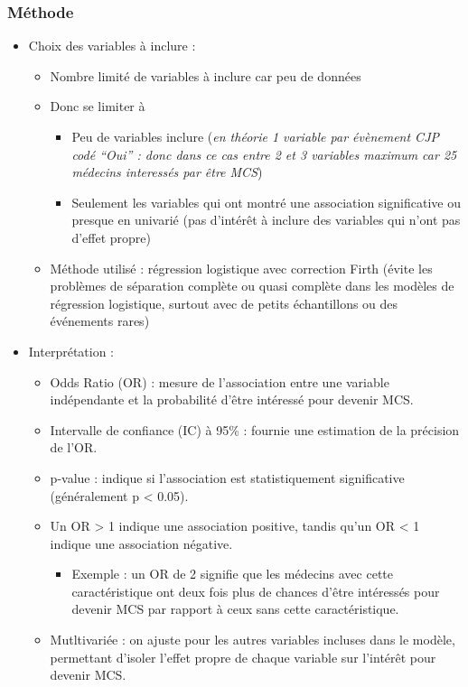 \documentclass[
]{article}
\providecommand{\tightlist}{%
  \setlength{\itemsep}{0pt}\setlength{\parskip}{0pt}}
\begin{document}
\subsubsection{Méthode}\label{muxe9thode}

\begin{itemize}
\item
  Choix des variables à inclure :

  \begin{itemize}
  \item
    Nombre limité de variables à inclure car peu de données
  \item
    Donc se limiter à

    \begin{itemize}
    \item
      Peu de variables inclure (\emph{en théorie 1 variable par
      évènement CJP codé ``Oui'' : donc dans ce cas entre 2 et 3
      variables maximum car 25 médecins interessés par être MCS})
    \item
      Seulement les variables qui ont montré une association
      significative ou presque en univarié (pas d'intérêt à inclure des
      variables qui n'ont pas d'effet propre)
    \end{itemize}
  \item
    Méthode utilisé : régression logistique avec correction Firth (évite
    les problèmes de séparation complète ou quasi complète dans les
    modèles de régression logistique, surtout avec de petits
    échantillons ou des événements rares)
  \end{itemize}
\item
  Interprétation :

  \begin{itemize}
  \item
    Odds Ratio (OR) : mesure de l'association entre une variable
    indépendante et la probabilité d'être intéressé pour devenir MCS.
  \item
    Intervalle de confiance (IC) à 95\% : fournie une estimation de la
    précision de l'OR.
  \item
    p-value : indique si l'association est statistiquement significative
    (généralement p \textless{} 0.05).
  \item
    Un OR \textgreater{} 1 indique une association positive, tandis
    qu'un OR \textless{} 1 indique une association négative.

    \begin{itemize}
    \tightlist
    \item
      Exemple : un OR de 2 signifie que les médecins avec cette
      caractéristique ont deux fois plus de chances d'être intéressés
      pour devenir MCS par rapport à ceux sans cette caractéristique.
    \end{itemize}
  \item
    Mutltivariée : on ajuste pour les autres variables incluses dans le
    modèle, permettant d'isoler l'effet propre de chaque variable sur
    l'intérêt pour devenir MCS.
  \end{itemize}
\end{itemize}
\end{document}
